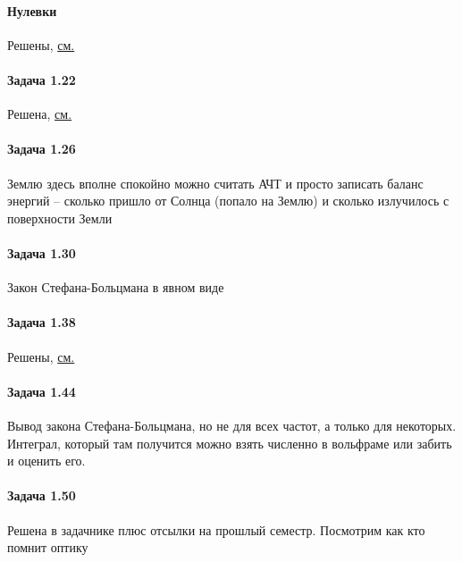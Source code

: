 \documentclass[12pt]{article}
\begin{document}
\paragraph{Нулевки} Решены, \hyperref[task_011]{см.}
\paragraph{Задача 1.22} Решена, \hyperref[task_122]{см.}
\paragraph{Задача 1.26} Землю здесь вполне спокойно можно считать АЧТ и просто записать баланс энергий -- сколько пришло от Солнца (попало на Землю) и сколько излучилось с поверхности Земли
\paragraph{Задача 1.30} Закон Стефана-Больцмана в явном виде
\paragraph{Задача 1.38} Решены, \hyperref[task_138]{см.}
\paragraph{Задача 1.44} Вывод закона Стефана-Больцмана, но не для всех частот, а только для некоторых. Интеграл, который там получится можно взять численно в вольфраме или забить и оценить его.
\paragraph{Задача 1.50} Решена в задачнике плюс отсылки на прошлый семестр. Посмотрим как кто помнит оптику
\end{document}
